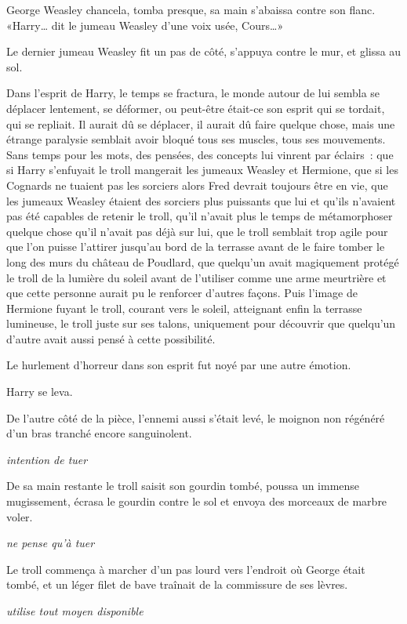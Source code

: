George Weasley chancela, tomba presque, sa main s'abaissa contre son flanc. «Harry… dit le jumeau Weasley d'une voix usée, Cours…»

Le dernier jumeau Weasley fit un pas de côté, s'appuya contre le mur, et glissa au sol.

Dans l'esprit de Harry, le temps se fractura, le monde autour de lui sembla se déplacer lentement, se déformer, ou peut-être était-ce son esprit qui se tordait, qui se repliait. Il aurait dû se déplacer, il aurait dû faire quelque chose, mais une étrange paralysie semblait avoir bloqué tous ses muscles, tous ses mouvements. Sans temps pour les mots, des pensées, des concepts lui vinrent par éclairs~: que si Harry s'enfuyait le troll mangerait les jumeaux Weasley et Hermione, que si les Cognards ne tuaient pas les sorciers alors Fred devrait toujours être en vie, que les jumeaux Weasley étaient des sorciers plus puissants que lui et qu'ils n'avaient pas été capables de retenir le troll, qu'il n'avait plus le temps de métamorphoser quelque chose qu'il n'avait pas déjà sur lui, que le troll semblait trop agile pour que l'on puisse l'attirer jusqu'au bord de la terrasse avant de le faire tomber le long des murs du château de Poudlard, que quelqu'un avait magiquement protégé le troll de la lumière du soleil avant de l'utiliser comme une arme meurtrière et que cette personne aurait pu le renforcer d'autres façons. Puis l'image de Hermione fuyant le troll, courant vers le soleil, atteignant enfin la terrasse lumineuse, le troll juste sur ses talons, uniquement pour découvrir que quelqu'un d'autre avait aussi pensé à cette possibilité.

Le hurlement d'horreur dans son esprit fut noyé par une autre émotion.

Harry se leva.

De l'autre côté de la pièce, l'ennemi aussi s'était levé, le moignon non régénéré d'un bras tranché encore sanguinolent.

\emph{intention de tuer}

De sa main restante le troll saisit son gourdin tombé, poussa un immense mugissement, écrasa le gourdin contre le sol et envoya des morceaux de marbre voler.

\emph{ne pense qu'à tuer}

Le troll commença à marcher d'un pas lourd vers l'endroit où George était tombé, et un léger filet de bave traînait de la commissure de ses lèvres.

\emph{utilise tout moyen disponible}

